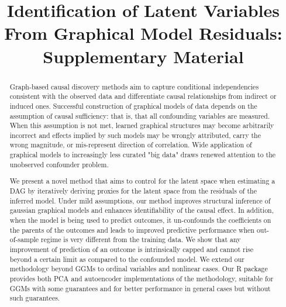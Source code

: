 \documentclass[letterpaper]{article}
\title{Identification of Latent Variables From Graphical Model Residuals: Supplementary Material}
\begin{document}
\maketitle

\begin{abstract}
Graph-based causal discovery methods aim to capture conditional independencies consistent with the observed data and differentiate causal relationships from indirect or induced ones.  Successful construction of graphical models of data depends on the assumption of causal sufficiency: that is, that all confounding variables are measured. When this assumption is not met, learned graphical structures may become arbitrarily incorrect and effects implied by such models may be wrongly attributed, carry the wrong magnitude, or mis-represent direction of correlation.  Wide application of graphical models to increasingly less curated "big data" draws renewed attention to the unobserved confounder problem.  

We present a novel method that aims to control for the latent space when estimating a DAG by iteratively deriving proxies for the latent space from the residuals of the inferred model.  Under mild assumptions, our method improves structural inference of gaussian graphical models and enhances identifiability of the causal effect. In addition, when the model is being used to predict outcomes, it un-confounds the coefficients on the parents of the outcomes and leads to improved predictive performance when out-of-sample regime is very different from the training data.  We show that any improvement of prediction of an outcome is intrinsically capped and cannot rise beyond a certain limit as compared to the confounded model.  We extend our methodology beyond GGMs to ordinal variables and nonlinear cases.  Our R package provides both PCA and autoencoder implementations of the methodology, suitable for GGMs with some guarantees and for better performance in general cases but without such guarantees. 
\end{abstract}
\end{document}
